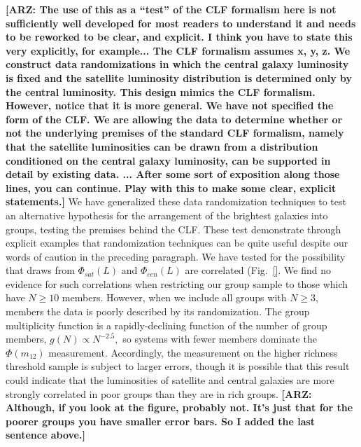 \documentclass[usenatbib,usegraphicx,letterpaper]{mn2e}
\newcommand{\monetwo}{m_{12}}
\begin{document}
{\bf [ARZ: The use of this as a ``test'' of the CLF formalism 
here is not sufficiently well developed for most readers to 
understand it and needs to be reworked to be clear, and explicit. 
I think you have to state this very explicitly, for example...  
The CLF formalism assumes x, y, z.  We construct data randomizations 
in which the central galaxy luminosity is fixed and the satellite 
luminosity distribution is determined only by the central luminosity. 
This design mimics the CLF formalism.  However, notice that it is 
more general. We have not specified the form of the CLF.  We are 
allowing the data to determine whether or not the underlying premises
of the standard CLF formalism, namely that the satellite luminosities can 
be drawn from a distribution conditioned on the central galaxy luminosity, 
can be supported in detail by existing data. ... After some sort of exposition 
along those lines, you can continue.  Play with this to make some 
clear, explicit statements.]}  
We have generalized these data randomization techniques to
test an alternative hypothesis for the arrangement of the brightest
galaxies into groups, testing the premises behind the CLF.
These test demonstrate through explicit examples that randomization 
techniques can be quite useful despite our words of caution in the 
preceding paragraph. We have tested for the possibility that
draws from $\Phi_{sat}(L)$ and $\Phi_{cen}(L)$ are correlated (Fig.~\ref{}. 
We find no evidence for such correlations when restricting our group sample to
those which have $N \geq 10$ members.  
However, when we include all groups
with $N \geq 3$, members the data is poorly described by its
randomization. The group multiplicity function is a 
rapidly-declining function of the number of group members, 
$g(N)\propto N^{-2.5},$ so systems with fewer
members dominate the $\Phi(\monetwo)$ measurement.  
Accordingly, the measurement on the higher richness threshold 
sample is subject to larger errors, though it is possible that 
this result could indicate that the luminosities of 
satellite and central galaxies are more strongly correlated in poor 
groups than they are in rich groups. {\bf [ARZ: Although, if you 
look at the figure, probably not.  It's just that for the 
poorer groups you have smaller error bars. So I added the 
last sentence above.]}
\end{document}

